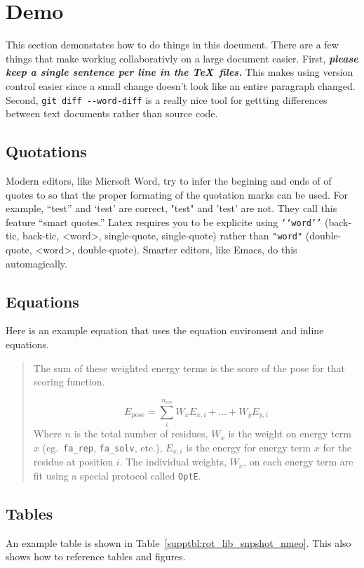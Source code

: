 \section{Demo}
This section demonstates how to do things in this document.
There are a few things that make working collaborativly on a large document easier. 
First, \textit{\textbf{please keep a single sentence per line in the \TeX\ files.}}
This makes using version control easier since a small change doesn't look like an entire paragraph changed.
Second, \texttt{git diff -{}-word-diff} is a really nice tool for gettting differences between text documents rather than source code.

\subsection{Quotations}
Modern editors, like Micrsoft Word, try to infer the begining and ends of of quotes to so that the proper formating of the quotation marks can be used. For example, ``test'' and `test' are correct, "test" and 'test' are not.
They call this feature ``smart quotes.''
Latex requires you to be explicite using \texttt{`{}`word'{}'} (back-tic, back-tic, <word>, single-quote, single-quote) rather than \texttt{"word"} (double-quote, <word>, double-quote).
Smarter editors, like Emacs, do this automagically.

\subsection{Equations}
Here is an example equation that uses the equation enviroment and inline equations.
\begin{quote}
The sum of these weighted energy terms is the score of the pose for that scoring function. 

\begin{equation}
E_{\text{pose}} = \sum_{i}^{n_{\text{res}}} W_{x} E_{x,i} + ... + W_{y} E_{y,i}
\end{equation}
Where $n$ is the total number of residues, $W_{x}$ is the weight on energy term $x$ (eg.\ \texttt{fa\_rep}, \texttt{fa\_solv}, etc.), $E_{x,i}$ is the energy for energy term $x$ for the residue at position $i$. 
The individual weights, $W_x$, on each energy term are fit using a special protocol called \texttt{OptE}.
\end{quote}

\subsection{Tables}
An example table is shown in Table~\ref{supptbl:rot_lib_snpshot_nmeo}.
This also shows how to reference tables and figures.

